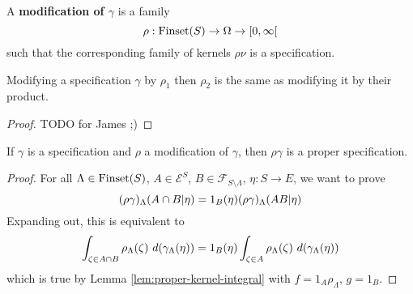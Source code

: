 \begin{definition}[Modification]
    \label{def:modification}
    \leanok

    A {\bf modification of $\gamma$} is a family
    $$\rho : \operatorname{Finset}(S) \to \Omega \to [0, \infty[$$
    such that the corresponding family of kernels $\rho\nu$ is a specification.
\end{definition}

\begin{lemma}
    \label{lem:modification-modification}
    \leanok

    Modifying a specification $\gamma$ by $\rho_1$ then $\rho_2$ is the same as modifying it by their product.
\end{lemma}
\begin{proof}

    TODO for James ;)
\end{proof}


\begin{lemma}
    \label{lem:modification-proper}
    \leanok

    If $\gamma$ is a specification and $\rho$ a modification of $\gamma$, then $\rho\gamma$ is a proper specification.
\end{lemma}
\begin{proof}
    \leanok

    For all $\Lambda \in \operatorname{Finset}(S)$, $A \in \mathcal E^S$, $B \in \mathcal{F}_{S\setminus\Lambda}$, $\eta : S \to E$, we want to prove
    $$(\rho\gamma)_\Lambda(A \cap B | \eta) = 1_B(\eta) (\rho\gamma)_\Lambda(A B | \eta)$$
    Expanding out, this is equivalent to
    $$\int_{\zeta \in A \inter B} \rho_\Lambda(\zeta)\ d(\gamma_\Lambda(\eta)) = 1_B(\eta) \int_{\zeta \in A} \rho_\Lambda(\zeta)\ d(\gamma_\Lambda(\eta))$$
    which is true by Lemma \ref{lem:proper-kernel-integral} with $f = 1_A\rho_\Lambda$, $g = 1_B$.
\end{proof}


